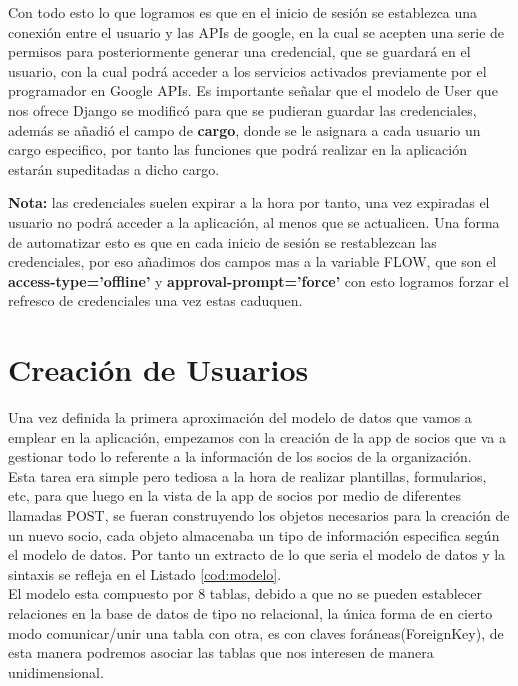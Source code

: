 Con todo esto lo que logramos es que en el inicio de sesión se establezca una conexión entre el usuario y las APIs de google, en la cual se acepten una serie de permisos para posteriormente generar una credencial,
que se guardará en el usuario, con la cual podrá acceder a los servicios activados previamente por el programador en Google APIs. Es importante señalar que el modelo de User que nos ofrece Django se modificó para que
se pudieran guardar las credenciales, además se añadió el campo de \textbf{cargo}, donde se le asignara a cada usuario un cargo especifico, por tanto las funciones que podrá realizar en la aplicación estarán supeditadas a dicho cargo.

\textbf{Nota:} las credenciales suelen expirar a la hora por tanto, una vez expiradas el usuario no podrá acceder a la aplicación, al menos que se actualicen. Una forma de automatizar esto es que en cada inicio de sesión
se restablezcan las credenciales, por eso añadimos dos campos mas a la variable FLOW, que son el \textbf{access-type='offline'} y \textbf{approval-prompt='force'} con esto logramos forzar el refresco de
credenciales una vez estas caduquen.


\section{Creación de Usuarios}
\label{4:sec5}

Una vez definida la primera aproximación del modelo de datos que vamos a emplear en la aplicación, empezamos con la creación de la app de socios que va a gestionar todo lo referente a la información de los socios de 
la organización.\\

Esta tarea era simple pero tediosa a la hora de realizar plantillas, formularios, etc, para que luego en la vista de la app de socios por medio de diferentes llamadas POST, se fueran construyendo los objetos necesarios
para la creación de un nuevo socio, cada objeto almacenaba un tipo de información especifica según el modelo de datos. Por tanto un extracto de lo que seria el modelo de datos y la sintaxis se refleja en el Listado \ref{cod:modelo}.\\



El modelo esta compuesto por 8 tablas, debido a que no se pueden establecer relaciones en la base de datos de tipo no relacional, la única forma de en cierto modo comunicar/unir una tabla con otra,
es con claves foráneas(ForeignKey), de esta manera podremos asociar las tablas que nos interesen de manera unidimensional.\\

